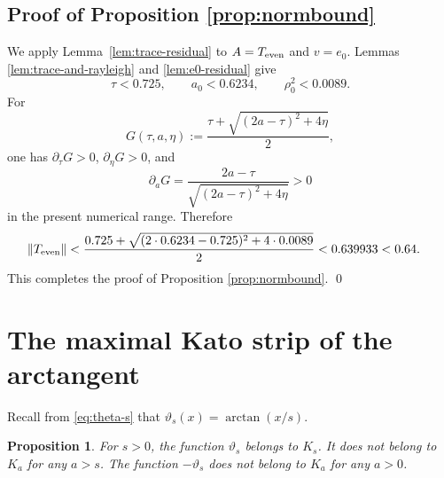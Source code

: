 \documentclass[11pt]{article}
\newtheorem{proposition}[theorem]{Proposition}
\theoremstyle{definition}
\theoremstyle{remark}
\newcommand{\norm}[1]{\left\lVert #1\right\rVert}
\begin{document}

\subsection*{Proof of Proposition \ref{prop:normbound}}

We apply Lemma~\ref{lem:trace-residual} to
$A=T_{\rm even}$ and $v=e_0$.  Lemmas
\ref{lem:trace-and-rayleigh} and \ref{lem:e0-residual} give
\[
\tau<0.725,
\qquad
a_0<0.6234,
\qquad
\rho_0^2<0.0089.
\]
For
\[
G(\tau,a,\eta)
:=\frac{\tau+\sqrt{(2a-\tau)^2+4\eta}}{2},
\]
one has $\partial_\tau G>0$, $\partial_\eta G>0$, and
\[
\partial_aG
=\frac{2a-\tau}{\sqrt{(2a-\tau)^2+4\eta}}>0
\]
in the present numerical range.  Therefore
\begin{align*}
\norm{T_{\rm even}}
&<\frac{0.725+
\sqrt{(2\cdot0.6234-0.725)^2+4\cdot0.0089}}{2}<0.639933<0.64.
\end{align*}
This completes the proof of Proposition \ref{prop:normbound}.
\qed




\section{The maximal Kato strip of the arctangent}\label{sec:arctank1}

Recall from \eqref{eq:theta-s} that $\vartheta_s(x)=\arctan(x/s)$.

\begin{proposition}\label{prop:arctan-strip}
For $s>0$, the function $\vartheta_s$ belongs to $K_s$.  It does not belong to $K_a$ for any $a>s$. The function $-\vartheta_s$ does not belong to $K_a$ for any $a>0$.
\end{proposition}
\end{document}
